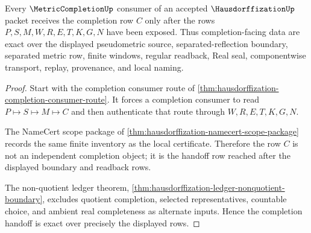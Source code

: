 \begin{theorem}
\label{thm:hausdorffization-completion-handoff-exactness}
Every $\MetricCompletionUp$ consumer of an accepted $\HausdorffizationUp$ packet receives the completion row $C$ only after the rows $P,S,M,W,R,E,T,K,G,N$ have been exposed. Thus completion-facing data are exact over the displayed pseudometric source, separated-reflection boundary, separated metric row, finite windows, regular readback, Real seal, componentwise transport, replay, provenance, and local naming.
\end{theorem}
\begin{proof}
Start with the completion consumer route of \autoref{thm:hausdorffization-completion-consumer-route}. It forces a completion consumer to read $P \longmapsto S \longmapsto M \longmapsto C$ and then authenticate that route through $W,R,E,T,K,G,N$.

The NameCert scope package of \autoref{thm:hausdorffization-namecert-scope-package} records the same finite inventory as the local certificate. Therefore the row $C$ is not an independent completion object; it is the handoff row reached after the displayed boundary and readback rows.

The non-quotient ledger theorem, \autoref{thm:hausdorffization-ledger-nonquotient-boundary}, excludes quotient completion, selected representatives, countable choice, and ambient real completeness as alternate inputs. Hence the completion handoff is exact over precisely the displayed rows.
\end{proof}

